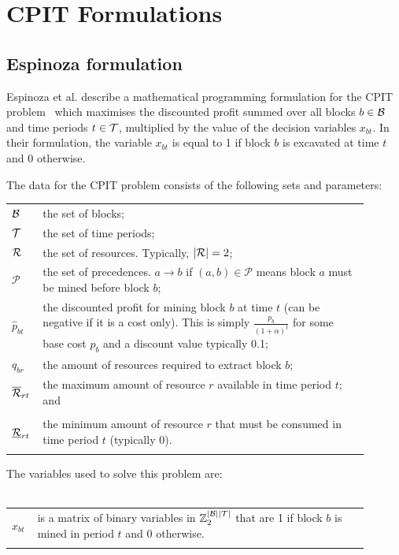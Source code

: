 \documentclass[journal]{IEEEtran}
\begin{document}
\newpage
\appendices
\section{CPIT Formulations}\label{app:cpit}
\subsection*{Espinoza formulation}
Espinoza et al. describe a mathematical programming formulation for the CPIT problem~\cite{minelib} which maximises the discounted profit summed over all blocks $b \in \S{B}$ and time periods $t \in \S{T}$, multiplied by the value of the decision variables $x_{bt}$. In their formulation, the variable $x_{bt}$ is equal to 1 if block $b$ is excavated at time $t$ and 0 otherwise.\par 

The data for the CPIT problem consists of the following sets and parameters:

\begin{tabular}{p{0.05\linewidth}p{0.85\linewidth}}
$\S{B}$ & the set of blocks;\\
$\S{T}$ & the set of time periods;\\
$\S{R}$ & the set of resources. Typically, $|\S{R}| = 2$;\\
$\mathcal{P}$ & the set of precedences. $a \to b$ if $(a,b) \in \mathcal{P}$
                means block $a$ must be mined before block $b$;\\
$\hat{p}_{bt}$  & the discounted profit for mining block $b$ at time $t$
            (can be negative if it is a cost only). This
            is simply $\frac{p_b}{(1+\alpha)^t}$ for some base cost
            $p_b$ and a discount value typically 0.1;\\
$q_{br}$ & the amount of resources required to extract block $b$;\\
$\overline{\S{R}}_{rt}$ & the maximum amount of resource $r$ available in time period $t$; and\\\hfill\\
$\underline{\S{R}}_{rt}$ & the minimum amount of resource $r$ that must be consumed in time period $t$ (typically 0).\\\hfill\\
\end{tabular}
\par
The variables used to solve this problem are:\\\hfill\\
\begin{tabular}{p{0.05\linewidth}p{0.85\linewidth}}
$x_{bt}$ & is a matrix of binary variables in $\Bin^{|\S{B}||\S{T}|}$ that are 1 if block $b$ is mined in
                      period $t$ and 0 otherwise.\\\hfill\\
\end{tabular}
\end{document}
